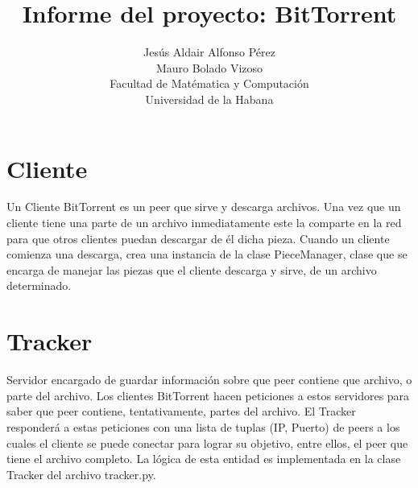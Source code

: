 \documentclass[a4paper,12pt]{article}
\title{Informe del proyecto: BitTorrent}
\author{Jesús Aldair Alfonso Pérez \\ Mauro Bolado Vizoso\\ Facultad de Matématica y Computación \\ Universidad de la Habana}
\date{}
\begin{document}
\maketitle

\newpage

\section{Cliente}

Un Cliente BitTorrent es un peer que sirve y descarga archivos. Una vez que un cliente tiene una parte de un archivo inmediatamente este la comparte en la red para que otros clientes puedan descargar de \'el dicha pieza. Cuando un cliente comienza una descarga, crea una instancia de la clase PieceManager, clase que se encarga de manejar las piezas que el cliente descarga y sirve, de un archivo determinado.

\section{Tracker}

Servidor encargado de guardar informaci\'on sobre que peer contiene que archivo, o parte del archivo. Los clientes BitTorrent hacen peticiones a estos servidores
para saber que peer contiene, tentativamente, partes del archivo. El Tracker responder\'a a estas peticiones con una lista de tuplas (IP, Puerto) de peers a los
cuales el cliente se puede conectar para lograr su objetivo, entre ellos, el peer
que tiene el archivo completo. La l\'ogica de esta entidad es implementada en la
clase Tracker del archivo tracker.py.
\end{document}
